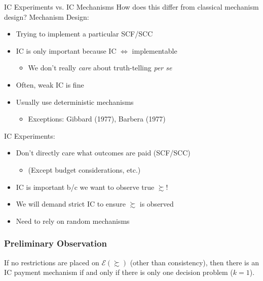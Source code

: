 \begin{frame}{IC Experiments vs. IC Mechanisms}
How does this differ from classical mechanism design?
\br
Mechanism Design:
\begin{itemize}
    \item Trying to implement a particular SCF/SCC
    \item IC is only important because IC $\iff$ implementable
    \begin{itemize}
        \item We don't really \textit{care} about truth-telling \textit{per se}
    \end{itemize}
    \item Often, weak IC is fine
    \item Usually use deterministic mechanisms
    \begin{itemize}
        \item Exceptions: Gibbard (1977), Barbera (1977)
    \end{itemize}
\end{itemize}
\br
IC Experiments:
\begin{itemize}
    \item Don't directly care what outcomes are paid (SCF/SCC)
    \begin{itemize}
        \item (Except budget considerations, etc.)
    \end{itemize}
    \item IC is important b/c we want to observe true $\succsim$!
    \item We will demand strict IC to ensure $\succsim$ is observed
    \item Need to rely on random mechanisms
\end{itemize}
    
\end{frame}



\begin{frame}
  \frametitle{Preliminary Observation}



\begin{proposition}
If no restrictions are placed on $\mathcal{E}(\succsim)$ (other than consistency), then there is an IC payment mechanism if and only if there is only one decision problem ($k=1$).
\end{proposition}

%
%


\end{frame}


